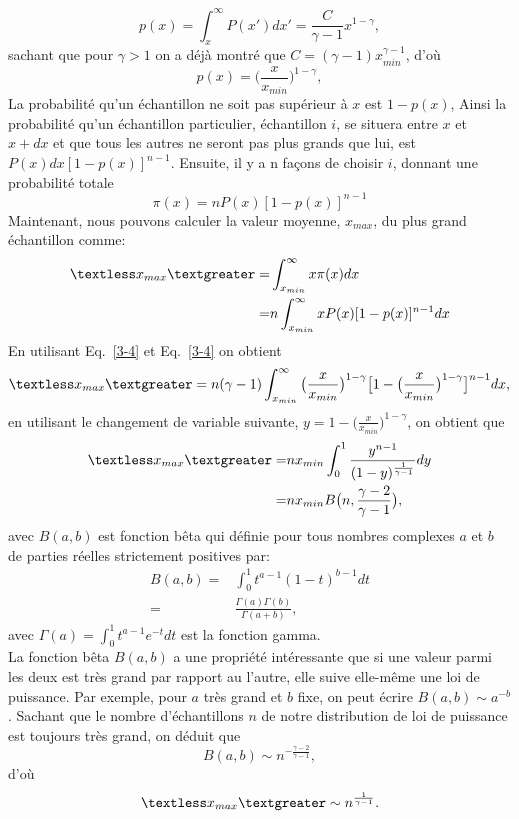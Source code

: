 \begin{equation}
p(x)=\int_{x}^{\infty}P(x')dx'=\frac{C}{\gamma-1}x^{1-\gamma},
\end{equation}
sachant que pour $\gamma>1$ on a déjà montré que $C=(\gamma-1)x_{min}^{\gamma-1}$, d'où 
\begin{equation}
p(x)=\Big(\frac{x}{x_{min}}\Big)^{1-\gamma},
\label{3-8}
\end{equation}
La probabilité qu'un échantillon ne soit pas supérieur à $x$ est $1-p(x)$, Ainsi la probabilité qu'un
échantillon particulier, échantillon $i$, se situera entre $x$ et $x+dx$ et que tous les autres ne seront pas plus grands que lui, est $P(x)dx[1-p(x)]^{n-1}$. Ensuite, il y a n façons de choisir $i$, donnant une probabilité totale
\begin{equation}
\pi(x)=nP(x)[1-p(x)]^{n-1}
\end{equation}
Maintenant, nous pouvons calculer la valeur moyenne, $x_{max}$,  du plus grand échantillon comme:
\begin{align}
\textless x_{max}\textgreater=&\int_{x_{min}}^{\infty}x\pi(x)dx\nonumber \\
=&n\int_{x_{min}}^{\infty}xP(x)[1-p(x)]^{n-1}dx
\end{align}
En utilisant Eq.~\eqref{3-4}  et Eq.~\eqref{3-4} on obtient
\begin{equation}
\textless x_{max}\textgreater=n(\gamma-1)\int_{x_{min}}^{\infty}\big(\frac{x}{x_{min}}\big)^{1-\gamma}\big[1-\big(\frac{x}{x_{min}}\big)^{1-\gamma}\big]^{n-1}dx,
\end{equation}
en utilisant le changement de variable suivante, $y=1-\big(\frac{x}{x_{min}}\big)^{1-\gamma}$, on obtient que
\begin{align}
\textless x_{max}\textgreater=&nx_{min}\int_{0}^{1}\frac{y^{n-1}}{(1-y)^{\frac{1}{\gamma-1}}}dy\nonumber \\
=&nx_{min}B\big(n,\frac{\gamma-2}{\gamma-1}\big),
\end{align}
avec $B(a,b)$ est fonction bêta qui définie pour tous nombres complexes $a$ et $b$ de parties réelles strictement positives par:
\begin{align}
B(a,b)=&\int_0^1t^{a-1}(1-t)^{b-1}dt\nonumber\\
=&\frac{\Gamma(a)\Gamma(b)}{\Gamma(a+b)},
\end{align}
avec $\Gamma(a)=\int_0^1t^{a-1}e^{-t}dt$ est la fonction gamma.\\

La fonction bêta $B(a,b)$ a une propriété intéressante que si une valeur parmi les deux est très grand par rapport au l'autre, elle suive elle-même une loi de puissance. Par exemple, pour $a$ très grand et $b$ fixe, on peut écrire $B(a,b)\sim a^{-b}$. Sachant que le nombre d'échantillons $n$ de notre distribution de loi de puissance est toujours très grand, on déduit que
\begin{equation}
B(a,b)\sim n^{-\frac{\gamma-2}{\gamma-1}},
\end{equation}
d'où
\begin{equation}
\textless x_{max}\textgreater\sim n^{\frac{1}{\gamma-1}}.
\end{equation}
